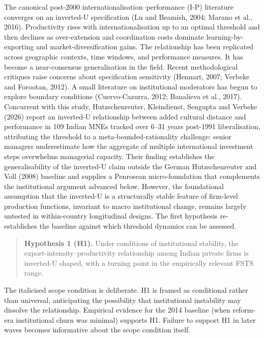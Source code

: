 \documentclass[
  12pt]{article}
\begin{document}
The canonical post-2000 internationalisation--performance (I-P)
literature converges on an inverted-U specification (Lu and Beamish,
2004; Marano et al., 2016). Productivity rises with internationalisation
up to an optimal threshold and then declines as over-extension and
coordination costs dominate learning-by-exporting and
market-diversification gains. The relationship has been replicated
across geographic contexts, time windows, and performance measures. It
has become a near-consensus generalisation in the field. Recent
methodological critiques raise concerns about specification sensitivity
(Hennart, 2007; Verbeke and Forootan, 2012). A small literature on
institutional moderators has begun to explore boundary conditions
(Cuervo-Cazurra, 2012; Banalieva et al., 2017). Concurrent with this
study, Hutzschenreuter, Kleindienst, Sengupta and Verbeke (2026) report
an inverted-U relationship between added cultural distance and
performance in 109 Indian MNEs tracked over 6--31 years post-1991
liberalisation, attributing the threshold to a meta-bounded-rationality
challenge: senior managers underestimate how the aggregate of multiple
international investment steps overwhelms managerial capacity. Their
finding establishes the generalisability of the inverted-U claim outside
the German Hutzschenreuter and Voll (2008) baseline and supplies a
Penrosean micro-foundation that complements the institutional argument
advanced below. However, the foundational assumption that the inverted-U
is a structurally stable feature of firm-level production functions,
invariant to macro institutional change, remains largely untested in
within-country longitudinal designs. The first hypothesis re-establishes
the baseline against which threshold dynamics can be assessed.

\begin{quote}
\textbf{Hypothesis 1 (H1).} Under conditions of institutional stability,
the export-intensity--productivity relationship among Indian private
firms is inverted-U shaped, with a turning point in the empirically
relevant FSTS range.
\end{quote}

The italicised scope condition is deliberate. H1 is framed as
conditional rather than universal, anticipating the possibility that
institutional instability may dissolve the relationship. Empirical
evidence for the 2014 baseline (when reform-era institutional churn was
minimal) supports H1. Failure to support H1 in later waves becomes
informative about the scope condition itself.
\end{document}
